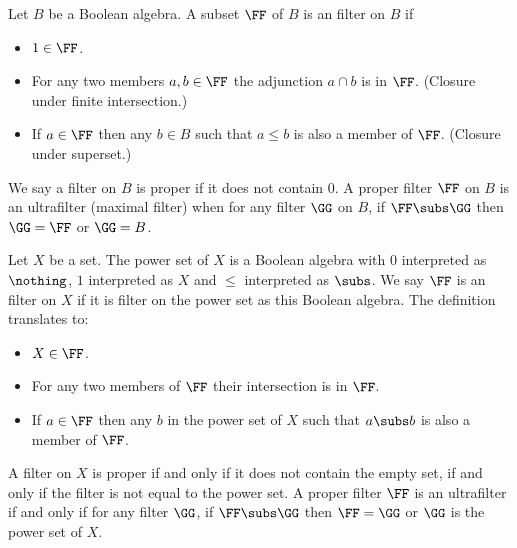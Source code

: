 \begin{dfn}
    Let $B$ be a Boolean algebra.
    A subset $\FF$ of $B$ is an filter on $B$ if
    \begin{itemize}
        \item $1 \in \FF$.
        \item For any two members $a,b \in \FF$ the adjunction
            $a \cap b$ is in $\FF$. (Closure under finite intersection.)
        \item If $a \in \FF$ then any $b \in B$ 
            such that $a \leq b$ is also a member of $\FF$. 
            (Closure under superset.)
    \end{itemize}
    We say a filter on $B$ is proper if it does not contain $0$.
    A proper filter $\FF$ on $B$ is an ultrafilter (maximal filter) when
    for any filter $\GG$ on $B$, if $\FF \subs \GG$ then $\GG = \FF$ 
    or $\GG = B$.
\end{dfn}

\begin{dfn}
    Let $X$ be a set. 
    The power set of $X$ is a Boolean algebra with $0$ interpreted as 
    $\nothing$, 
    $1$ interpreted as $X$ and $\leq$ interpreted as $\subs$.
    We say $\FF$ is an filter on $X$ if it is filter on the power set
    as this Boolean algebra.
    The definition translates to:
    \begin{itemize}
        \item $X \in \FF$.
        \item For any two members of $\FF$ their intersection is in $\FF$.
        \item If $a \in \FF$ then any $b$ in the power set of $X$ 
            such that $a \subs b$ is also a member of $\FF$.
    \end{itemize}
    A filter on $X$ is proper if and only if it does not contain the empty set,
    if and only if the filter is not equal to the power set.
    A proper filter $\FF$ is an ultrafilter if and only if
    for any filter $\GG$, 
    if $\FF \subs \GG$ then $\FF = \GG$ 
    or $\GG$ is the power set of $X$.
\end{dfn}

